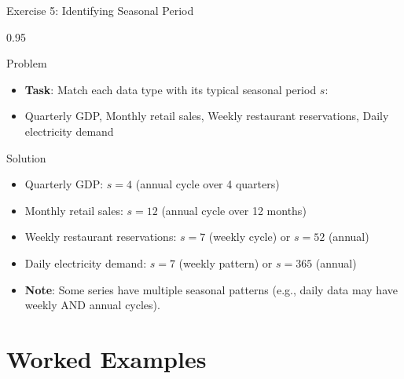 \documentclass[9pt, aspectratio=169, t]{beamer}
\begin{document}
\begin{frame}{Exercise 5: Identifying Seasonal Period}
    \begin{cminipage}{0.95\textwidth}
    \begin{alertblock}{Problem}
        \begin{itemize}\setlength{\itemsep}{0pt}
            \item \textbf{Task}: Match each data type with its typical seasonal period $s$:
            \item Quarterly GDP, Monthly retail sales, Weekly restaurant reservations, Daily electricity demand
        \end{itemize}
    \end{alertblock}

    \vspace{0.2cm}
    \begin{exampleblock}{Solution}
        {\small
        \begin{itemize}\setlength{\itemsep}{0pt}
            \item Quarterly GDP: $s = 4$ (annual cycle over 4 quarters)
            \item Monthly retail sales: $s = 12$ (annual cycle over 12 months)
            \item Weekly restaurant reservations: $s = 7$ (weekly cycle) or $s = 52$ (annual)
            \item Daily electricity demand: $s = 7$ (weekly pattern) or $s = 365$ (annual)
            \item \textbf{Note}: Some series have multiple seasonal patterns (e.g., daily data may have weekly AND annual cycles).
        \end{itemize}
        }
    \end{exampleblock}
    \end{cminipage}
\end{frame}

\section{Worked Examples}
\end{document}

